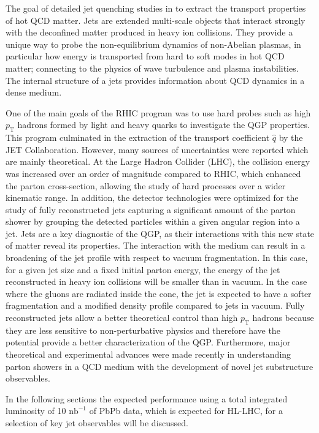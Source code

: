 The goal of detailed jet quenching studies in to extract the transport properties of hot QCD matter. Jets are extended multi-scale objects that interact strongly with the deconfined matter produced in heavy ion collisions. They provide a unique way to probe the non-equilibrium dynamics of non-Abelian plasmas, in particular how energy is transported from hard to soft modes in hot QCD matter; connecting to the physics of wave turbulence and plasma instabilities. The internal structure of a jets provides information about QCD dynamics in a dense medium.


One of the main goals of the RHIC program was to use hard probes such as high $p_{\mathrm{T}}$ hadrons formed by light and heavy quarks to investigate the QGP properties. This program culminated in the extraction of the transport coefficient $\hat q $ by the JET Collaboration. However, many sources of uncertainties were reported which are mainly theoretical. 
At the Large Hadron Collider (LHC), the collision energy was increased over an order of magnitude compared to RHIC, which enhanced the parton cross-section, allowing the study of hard processes over a wider kinematic range. In addition, the detector technologies were optimized for the study of fully reconstructed jets capturing a significant amount of the parton shower by grouping the detected particles within a given angular region into a jet. Jets are a key diagnostic of the QGP, as their interactions with this new state of matter reveal its properties. The interaction with the medium can result in a broadening of the jet profile with respect to vacuum fragmentation. In this case, for a given jet size and a fixed initial parton energy, the energy of the jet reconstructed in heavy ion collisions will be smaller than in vacuum. In the case where the gluons are radiated inside the cone, the jet is expected to have a softer fragmentation and a modified density profile compared to jets in vacuum. 
Fully reconstructed jets allow a better theoretical control than high $p_{\mathrm{T}}$ hadrons because they are less sensitive to non-perturbative physics and therefore have the potential provide a better characterization of the QGP. Furthermore, major theoretical and experimental advances were made recently in understanding parton showers in a QCD medium with the development of novel jet substructure observables.

In the following sections the expected performance using a total integrated luminosity of 10 $\mathrm{nb}^{-1}$ of PbPb data, which is expected for HL-LHC, for a selection of key jet observables will be discussed. %
